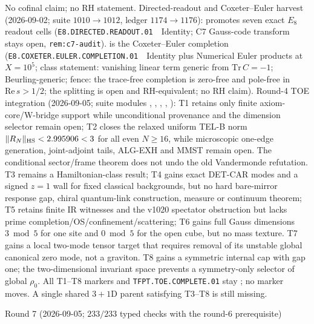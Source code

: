 \documentclass[11pt,a4paper]{article}
\begin{document}
\begin{keybox}
No cofinal claim; no RH statement.
Directed-readout and Coxeter--Euler harvest (2026-09-02; suite $1010\to1012$, ledger $1174\to1176$):
promotes seven exact $E_8$ readout cells (\texttt{E8.DIRECTED.READOUT.01}~\mE\ Identity;
C7 Gauss-code transform stays open, \texttt{rem:c7-audit}).
is the Coxeter--Euler completion (\texttt{E8.COXETER.EULER.COMPLETION.01}~\mE\ Identity plus Numerical Euler products at $X=10^5$;
class statement: vanishing linear term generic from $\mathrm{Tr}\,C=-1$; Beurling-generic;
fence: the trace-free completion is zero-free and pole-free in $\mathrm{Re}\,s>1/2$; the splitting is open and RH-equivalent; no RH claim).
Round-4 TOE integration (2026-09-05; suite modules
,
,
,
,
):
T1 retains only finite axiom-core/W-bridge support while unconditional provenance and
the dimension selector remain open; T2 closes the relaxed uniform TEL-B norm
$\|R_N\|_{\rm HS}<2.995906<3$ for all even $N\ge16$, while microscopic
one-edge generation, joint-adjoint tails, ALG-EXH and MMST remain open.
The conditional sector/frame theorem does not undo the old Vandermonde refutation.
T3 remains a Hamiltonian-class result; T4 gains exact DET-CAR modes and a signed
$z=1$ wall for fixed classical backgrounds, but no hard bare-mirror response
gap, chiral quantum-link construction, measure or continuum theorem;
T5 retains finite IR witnesses and the v1020 spectator obstruction but lacks
prime completion/OS/confinement/scattering;
T6 gains full Gauss dimensions $3\bmod5$ for one site and $0\bmod5$ for the
open cube, but no mass texture. T7 gains a local two-mode tensor target that
requires removal of its unstable global canonical zero mode, not a graviton.
T8 gains a symmetric internal cap with gap one; the two-dimensional invariant
space prevents a symmetry-only selector of global $\rho_0$. All T1--T8
markers and \texttt{TFPT.TOE.COMPLETE.01} stay \mO; no marker moves.  A single shared
$3{+}1$D parent satisfying T3--T8 is still missing.
\par\smallskip\noindent
Round 7 (2026-09-05; $233/233$ typed checks with the round-6 prerequisite)

\end{keybox}
\end{document}
